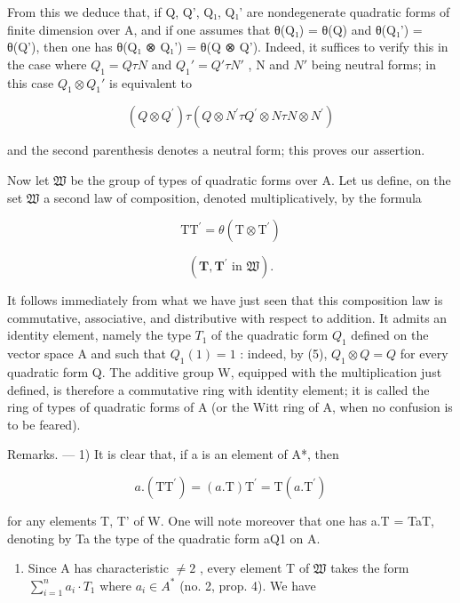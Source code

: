 From this we deduce that, if Q, Q', Q₁, Q₁' are nondegenerate quadratic forms of finite dimension over A, and if one assumes that θ(Q₁) = θ(Q) and θ(Q₁') = θ(Q'), then one has θ(Q₁ ⊗ Q₁') = θ(Q ⊗ Q'). Indeed, it suffices to verify this in the case where \(Q_{1} = Q \tau N\) and \(Q_{1}' = Q' \tau N'\) , N and \(N'\) being neutral forms; in this case \(Q_{1} \otimes Q_{1}'\) is equivalent to

\[
(Q \otimes Q ^ {\prime}) \tau (Q \otimes N ^ {\prime} \tau Q ^ {\prime} \otimes N \tau N \otimes N ^ {\prime})
\]

and the second parenthesis denotes a neutral form; this proves our assertion.

Now let \(\mathfrak{W}\) be the group of types of quadratic forms over A. Let us define, on the set \(\mathfrak{W}\) a second law of composition, denoted multiplicatively, by the formula

\[
\mathrm{TT} ^ {\prime} = \theta (\mathrm{T} \otimes \mathrm{T} ^ {\prime})\tag{6}
\]

\[
(\mathbf {T}, \mathbf {T} ^ {\prime} \text {   in   } \mathfrak {W}).
\]

It follows immediately from what we have just seen that this composition law is commutative, associative, and distributive with respect to addition. It admits an identity element, namely the type \(T_{1}\) of the quadratic form \(Q_{1}\) defined on the vector space A and such that \(Q_{1}(1)=1\) : indeed, by (5), \(Q_{1}\otimes Q=Q\) for every quadratic form Q. The additive group W, equipped with the multiplication just defined, is therefore a commutative ring with identity element; it is called the ring of types of quadratic forms of A (or the Witt ring of A, when no confusion is to be feared).

Remarks. --- 1) It is clear that, if a is an element of A*, then

\[
a. (\mathrm{TT} ^ {\prime}) = (a. \mathrm{T}) \mathrm{T} ^ {\prime} = \mathrm{T} (a. \mathrm{T} ^ {\prime})\tag{7}
\]

for any elements T, T' of W. One will note moreover that one has a.T = TaT, denoting by Ta the type of the quadratic form aQ1 on A.

\begin{enumerate}
\def\labelenumi{\arabic{enumi})}
\setcounter{enumi}{1}
\tightlist
\item
  Since A has characteristic \(\neq 2\) , every element T of \(\mathfrak{W}\) takes the form \(\sum_{i=1}^{n} a_i \cdot T_1\) where \(a_i \in A^*\) (no. 2, prop. 4). We have
\end{enumerate}

